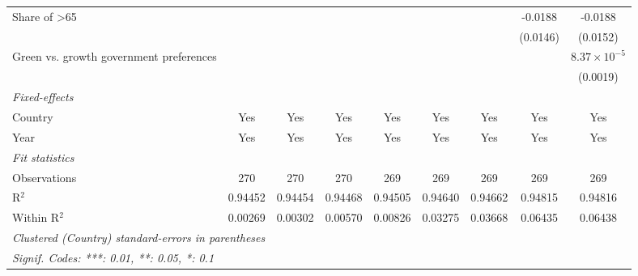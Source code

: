\begin{table}[htbp]
\begin{tabular}{lcccccccc}
      Share of >65                            &          &          &          &          &          &          & -0.0188  & -0.0188\\   
                                              &          &          &          &          &          &          & (0.0146) & (0.0152)\\   
      Green vs. growth government preferences &          &          &          &          &          &          &          & $8.37\times 10^{-5}$\\    
                                              &          &          &          &          &          &          &          & (0.0019)\\   
      \midrule
      \emph{Fixed-effects}\\
      Country                                 & Yes      & Yes      & Yes      & Yes      & Yes      & Yes      & Yes      & Yes\\  
      Year                                    & Yes      & Yes      & Yes      & Yes      & Yes      & Yes      & Yes      & Yes\\  
      \midrule
      \emph{Fit statistics}\\
      Observations                            & 270      & 270      & 270      & 269      & 269      & 269      & 269      & 269\\  
      R$^2$                                   & 0.94452  & 0.94454  & 0.94468  & 0.94505  & 0.94640  & 0.94662  & 0.94815  & 0.94816\\  
      Within R$^2$                            & 0.00269  & 0.00302  & 0.00570  & 0.00826  & 0.03275  & 0.03668  & 0.06435  & 0.06438\\  
      \midrule \midrule
      \multicolumn{9}{l}{\emph{Clustered (Country) standard-errors in parentheses}}\\
      \multicolumn{9}{l}{\emph{Signif. Codes: ***: 0.01, **: 0.05, *: 0.1}}\\
   \end{tabular}
\end{table}


